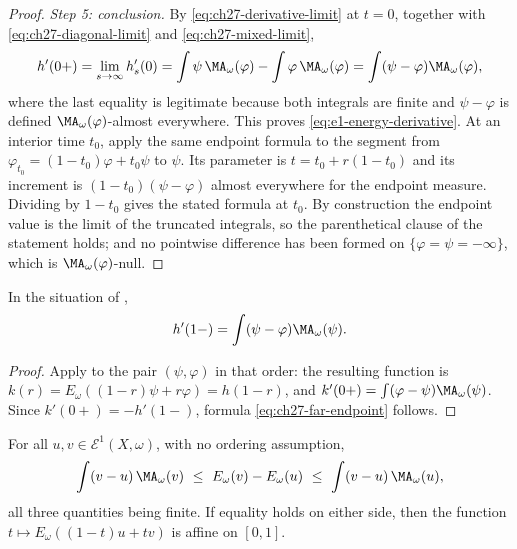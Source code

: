 \begin{proof}
\emph{Step 5: conclusion.}
By \eqref{eq:ch27-derivative-limit} at $t=0$, together with
\eqref{eq:ch27-diagonal-limit} and \eqref{eq:ch27-mixed-limit},
\[
 h'(0+)=\lim_{s\to\infty}h_s'(0)
 =\int\psi\,\MA_\omega(\varphi)-\int\varphi\,\MA_\omega(\varphi)
 =\int(\psi-\varphi)\MA_\omega(\varphi),
\]
where the last equality is legitimate because both integrals are finite and
$\psi-\varphi$ is defined $\MA_\omega(\varphi)$-almost everywhere.  This
proves \eqref{eq:e1-energy-derivative}.  At an interior time $t_0$,
apply the same endpoint formula to the segment from
$\varphi_{t_0}=(1-t_0)\varphi+t_0\psi$ to $\psi$.
Its parameter is $t=t_0+r(1-t_0)$ and its increment is
$(1-t_0)(\psi-\varphi)$ almost everywhere for the endpoint measure.
Dividing by $1-t_0$ gives the stated formula at $t_0$.
By construction the endpoint value is the
limit of the truncated integrals, so the parenthetical clause of the
statement holds; and no pointwise difference has been formed on
$\{\varphi=\psi=-\infty\}$, which is $\MA_\omega(\varphi)$-null.
\end{proof}

\begin{corollary}
\label{cor:ch27-far-endpoint}
In the situation of ,
\begin{equation}\label{eq:ch27-far-endpoint}
 h'(1-)=\int(\psi-\varphi)\MA_\omega(\psi).
\end{equation}
\end{corollary}

\begin{proof}
Apply  to the pair $(\psi,\varphi)$
in that order: the resulting function is $k(r)=E_\omega((1-r)\psi+r\varphi)
=h(1-r)$, and $k'(0+)=\int(\varphi-\psi)\MA_\omega(\psi)$.  Since
$k'(0+)=-h'(1-)$, formula \eqref{eq:ch27-far-endpoint} follows.
\end{proof}

\begin{corollary}
\label{cor:ch27-two-sided-sandwich}
For all $u,v\in\mathcal E^1(X,\omega)$, with no ordering assumption,
\begin{equation}\label{eq:ch27-two-sided-sandwich}
 \int(v-u)\,\MA_\omega(v)
 \ \leq\ E_\omega(v)-E_\omega(u)
 \ \leq\ \int(v-u)\,\MA_\omega(u),
\end{equation}
all three quantities being finite.  If equality holds on either side, then
the function $t\mapsto E_\omega((1-t)u+tv)$ is affine on $[0,1]$.
\end{corollary}


